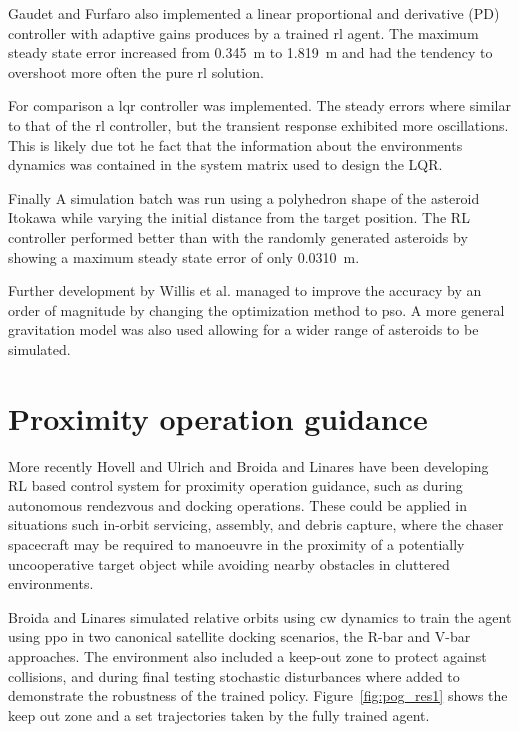 Gaudet and Furfaro also implemented a linear proportional and derivative (PD) controller with adaptive gains produces by a trained \acrshort{rl} agent. The maximum steady state error increased from 0.345~\si{m} to 1.819~\si{m} and had the tendency to overshoot more often the pure \acrshort{rl} solution.

For comparison a \acrfull{lqr} controller was implemented. The steady errors where similar to that of the \acrshort{rl} controller, but the transient response exhibited more oscillations. This is likely due tot he fact that the information about the environments dynamics was contained in the system matrix used to design the LQR.

Finally A simulation batch was run using a polyhedron shape of the asteroid Itokawa while varying the initial distance from the target position. The RL controller performed better than with the randomly generated asteroids by showing a maximum steady state error of only 0.0310~\si{m}.

Further development by Willis et al. \cite{willis2016reinforcement} managed to improve the accuracy by an order of magnitude by changing the optimization method to \acrfull{pso}. A more general gravitation model was also used allowing for a wider range of asteroids to be simulated. 

\section{Proximity operation guidance}
More recently Hovell and Ulrich \cite{hovell2020deep, hovell2021deep} and Broida and Linares \cite{broida2019spacecraft} have been developing RL based control system for proximity operation guidance, such as during autonomous rendezvous and docking operations. These could be applied in situations such in-orbit servicing, assembly, and debris capture, where the chaser spacecraft may be required to manoeuvre in the proximity of a potentially uncooperative target object while avoiding nearby obstacles in cluttered environments. 

Broida and Linares simulated relative orbits using \acrfull{cw} dynamics to train the agent using \acrshort{ppo} in two canonical satellite docking scenarios, the R-bar and V-bar approaches. The environment also included a keep-out zone to protect against collisions, and during final testing stochastic disturbances where added to demonstrate the robustness of the trained policy. Figure~\ref{fig:pog_res1} shows the keep out zone and a set trajectories taken by the fully trained agent.

